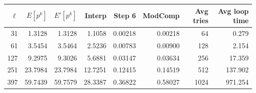 \documentclass[10pt]{beamer}
\newcommand{\0}{\mathcal{O}}  %
\begin{document}
\begin{frame}
\begin{columns}
\begin{column}{0.6\textwidth}
    \end{column}
  \end{columns}
  
  \smallskip
  \footnotesize
  \centering
  \begin{tabular}{r r r r r r r r}
    \hline
    $\ell$ & $E[p^k]$ & $E'[p^k]$ & Interp & Step 6 & ModComp & Avg tries & Avg loop time\\
    \hline
    31 & 1.3128 & 1.3128 & 1.1058 & 0.00218 & 0.00218 & 64 & 0.279\\
    61 & 3.5454 & 3.5464 & 2.5236 & 0.00783 & 0.00900 & 128 & 2.154 \\
    127 & 9.2975 & 9.3026 & 5.6881 & 0.03147 & 0.03634 & 256 & 17.359 \\
    251	& 23.7984 & 23.7984 & 12.7251 & 0.12415 & 0.14519 & 512 & 137.902 \\
    397 & 59.7439 & 59.7579 & 28.3387 & 0.36822 & 0.58027 & 1024 & 971.254 \\
    \hline
  \end{tabular}
\end{frame}

\end{document}
